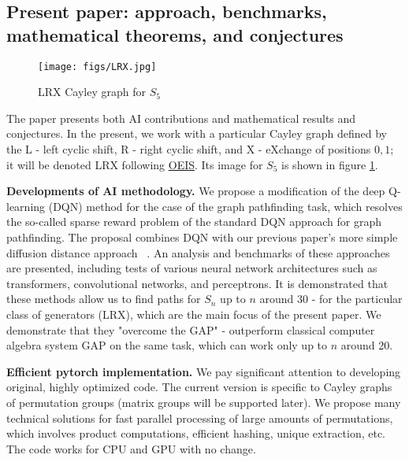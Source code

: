 \documentclass[atmp]{ipart_v1}
\numberwithin{equation}{section}
\theoremstyle{plain}%
\begin{document}
\subsection{Present paper: approach, benchmarks, mathematical theorems, and conjectures}

\begin{figure}[h!]
 \centering
 \texttt{[image: figs/LRX.jpg]}
 \caption{LRX Cayley graph for $S_5$}\label{fig:LRX1}
\end{figure}


The paper presents both AI contributions and mathematical results and conjectures. In the present, we work with a particular Cayley graph defined by the L - left cyclic shift, R - right cyclic shift, and X - eXchange of positions $0,1$; it will be denoted LRX following \href{https://oeis.org/A186783}{OEIS}. Its image for $S_5$ is shown in figure \ref{fig:LRX1}.

{\bf Developments of AI methodology.} We propose a modification of the deep Q-learning (DQN) method for the case of the graph pathfinding task, which resolves the so-called sparse reward problem of the standard DQN approach for graph pathfinding. The proposal combines DQN with our previous paper's more simple diffusion distance approach ~\cite{chervov2025machinelearningapproachbeats}. An analysis and benchmarks of these approaches are presented, including tests of various neural network architectures such as transformers, convolutional networks, and perceptrons. It is demonstrated that these methods allow us to find paths for $S_n$ up to $n$ around 30 - for the particular class of generators (LRX), which are the main focus of the present paper. We demonstrate that they "overcome the GAP" - outperform classical computer algebra system GAP on the same task, which can work only up to $n$ around 20. 

{\bf Efficient pytorch implementation.} We pay significant attention to developing original, highly optimized code. The current version is specific to Cayley graphs of permutation groups (matrix groups will be supported later). We propose many technical solutions for fast parallel processing of large amounts of permutations, which involves product computations, efficient hashing, unique extraction, etc. The code works for CPU and GPU with no change. 
\end{document}
